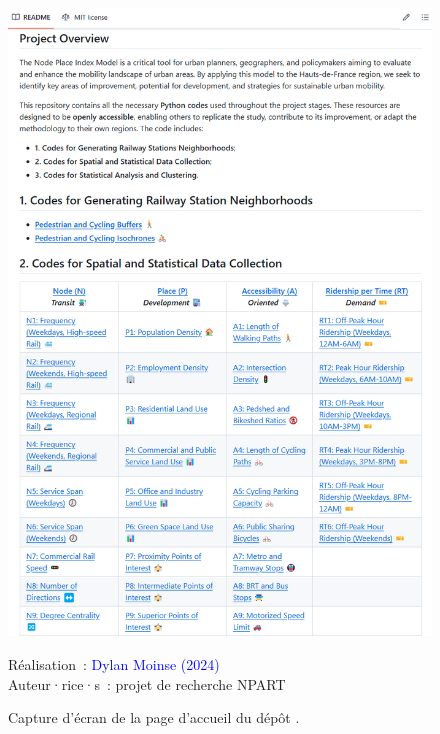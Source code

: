 \begin{refsegment}
    \begin{figure}[h!]\vspace*{4pt}
        \caption{Capture d’écran de la page d’accueil du dépôt .}
        \label{fig-chap6:screen-github-1}
        \centerline{\includegraphics[width=1\columnwidth]{src/Figures/Chap-6/FR_EN_NPART_Screen_Github_1.png}}
        \vspace{5pt}
        \begin{flushright}\scriptsize{
        Réalisation~: \textcolor{blue}{Dylan Moinse (2024)}
        \\
        Auteur·rice·s~: projet de recherche \acrshort{NPART}
        }\end{flushright}
    \end{figure}


\end{refsegment}
